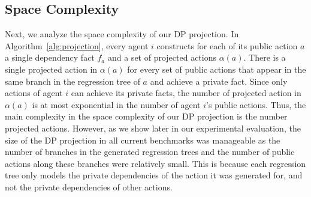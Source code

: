 \documentclass[letterpaper]{article}
\theoremstyle{definition}
\begin{document}
\subsection{Space Complexity}
Next, we analyze the space complexity of our DP projection.
In Algorithm~\ref{alg:projection}, every agent $i$ constructs for each of its public action $a$ a single dependency fact $f_a$ and  a set of projected actions $\alpha(a)$. There is a single projected action in $\alpha(a)$ for every set of public actions that appear in the same branch in the regression tree of $a$ and achieve a private fact. Since only actions of agent $i$ can achieve its private facts, the number of projected action in $\alpha(a)$ is at most exponential in the number of agent $i$'s public actions.
Thus, the main complexity in the space complexity of our DP projection is the number projected actions. %
However, as we show later in our experimental evaluation, the size of the DP projection in all current benchmarks was manageable as the number of branches in the generated regression trees and the number of public actions along these branches were relatively small. This is because each regression tree only models the private dependencies of the action it was generated for, and not  the private dependencies of other actions.






\end{document}
